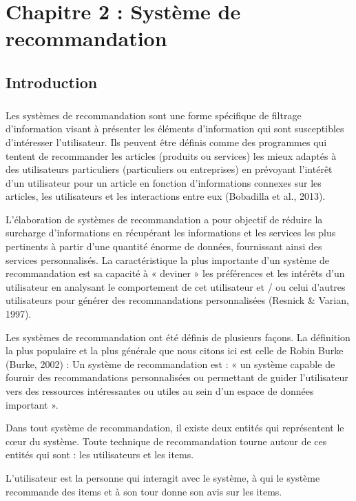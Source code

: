 \chapter{Chapitre 2 : Système de recommandation}
\section*{Introduction}
{}
\paragraph{}
Les systèmes de recommandation sont une forme spécifique de filtrage d’information visant à
présenter les éléments d'information qui sont susceptibles d'intéresser l'utilisateur. Ils peuvent être
définis comme des programmes qui tentent de recommander les articles (produits ou services) les
mieux adaptés à des utilisateurs particuliers (particuliers ou entreprises) en prévoyant l'intérêt d'un
utilisateur pour un article en fonction d'informations connexes sur les articles, les utilisateurs et les
interactions entre eux (Bobadilla et al., 2013).

L’élaboration de systèmes de recommandation a pour objectif de réduire la surcharge
d’informations en récupérant les informations et les services les plus pertinents à partir d’une
quantité énorme de données, fournissant ainsi des services personnalisés. La caractéristique la plus
importante d'un système de recommandation est sa capacité à « deviner » les préférences et les
intérêts d'un utilisateur en analysant le comportement de cet utilisateur et / ou celui d'autres
utilisateurs pour générer des recommandations personnalisées (Resnick \& Varian, 1997).

Les systèmes de recommandation ont été définis de plusieurs façons. La définition la plus populaire
et la plus générale que nous citons ici est celle de Robin Burke (Burke, 2002) :
Un système de recommandation est : « un système capable de fournir des recommandations
personnalisées ou permettant de guider l’utilisateur vers des ressources intéressantes ou utiles au
sein d’un espace de données important ».

Dans tout système de recommandation, il existe deux entités qui représentent le cœur du système.
Toute technique de recommandation tourne autour de ces entités qui sont : les utilisateurs et les
items.

L’utilisateur est la personne qui interagit avec le système, à qui le système recommande des items
et à son tour donne son avis sur les items.

